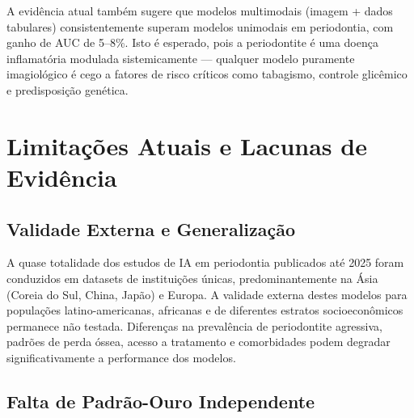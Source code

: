 A evidência atual também sugere que modelos multimodais (imagem + dados tabulares) consistentemente superam modelos unimodais em periodontia, com ganho de AUC de 5--8\%. Isto é esperado, pois a periodontite é uma doença inflamatória modulada sistemicamente --- qualquer modelo puramente imagiológico é cego a fatores de risco críticos como tabagismo, controle glicêmico e predisposição genética.


\section{Limitações Atuais e Lacunas de Evidência}

\subsection{Validade Externa e Generalização}

A quase totalidade dos estudos de IA em periodontia publicados até 2025 foram conduzidos em datasets de instituições únicas, predominantemente na Ásia (Coreia do Sul, China, Japão) e Europa. A validade externa destes modelos para populações latino-americanas, africanas e de diferentes estratos socioeconômicos permanece não testada. Diferenças na prevalência de periodontite agressiva, padrões de perda óssea, acesso a tratamento e comorbidades podem degradar significativamente a performance dos modelos.


\subsection{Falta de Padrão-Ouro Independente}

